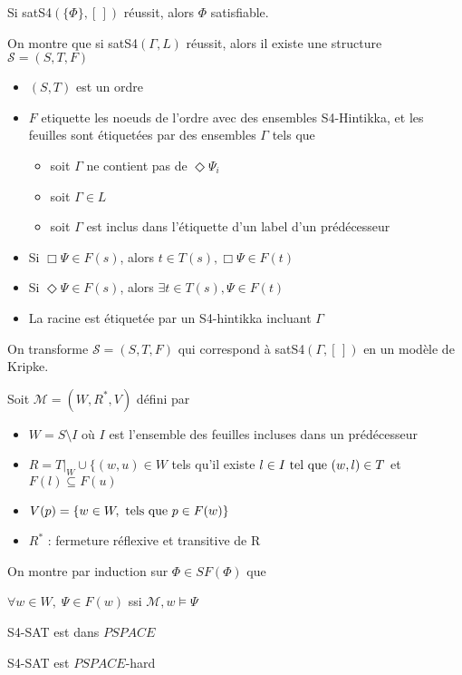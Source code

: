 \documentclass[10pt,a4paper]{article}
\newcommand{\M}{\mathcal{M}}
\begin{document}
\begin{thm}
 Si satS4$(\{\Phi\}, [\,])$ réussit, alors $\Phi$ satisfiable.
\end{thm}

\begin{dem}
  On montre que si  satS4$(\Gamma, L)$ réussit, alors il existe une structure $\mathcal{S} = (S, T, F)$ \tq[le]
\begin{itemize}
 \item $(S,T)$ est un ordre
 \item $F$ etiquette les noeuds de l'ordre avec des ensembles S4-Hintikka, et les feuilles sont étiquetées par des ensembles $\Gamma$ tels que
\begin{itemize}
 \item soit $\Gamma$ ne contient pas de $\Diamond \Psi_i$
 \item soit $\Gamma \in L$
 \item soit $\Gamma$ est inclus dans l'étiquette d'un label d'un prédécesseur
\end{itemize}
\item Si $\Box \Psi \in F(s)$, alors $t \in T(s), \Box \Psi \in F(t)$
\item Si $\Diamond \Psi \in F(s)$, alors $\exists t \in T(s),  \Psi \in F(t)$
\item La racine est étiquetée par un S4-hintikka incluant $\Gamma$
\end{itemize}

 On transforme $\mathcal{S} = (S, T, F)$ qui correspond à satS4$(\Gamma, [\,])$ en un modèle de Kripke.

Soit $\mathcal{M} = (W, R^*, V)$ défini par 
\begin{itemize}
 \item $W = S \setminus I$ où $I$ est l'ensemble des feuilles incluses dans un prédécesseur
 \item $R = T | _W \cup \{ (w,u) \in W$ tels qu'il existe $ l \in I \tq (w,l) \in T$ et $F(l) \subseteq F(u)$
 \item $V(p) =  \{w \in W, \tq[s] p \in F(w) \}$
 \item $R^*$ : fermeture réflexive et transitive de R
\end{itemize}
On montre par induction sur $\Phi \in SF(\Phi)$ que 

$\forall w \in W, \;\Psi \in F(w)$ ssi $\M,w \models \Psi$
\end{dem}

\begin{thm}
 S4-SAT est dans $PSPACE$
\end{thm}
\begin{thm}
 S4-SAT est $PSPACE$-hard
\end{thm}
\end{document}
